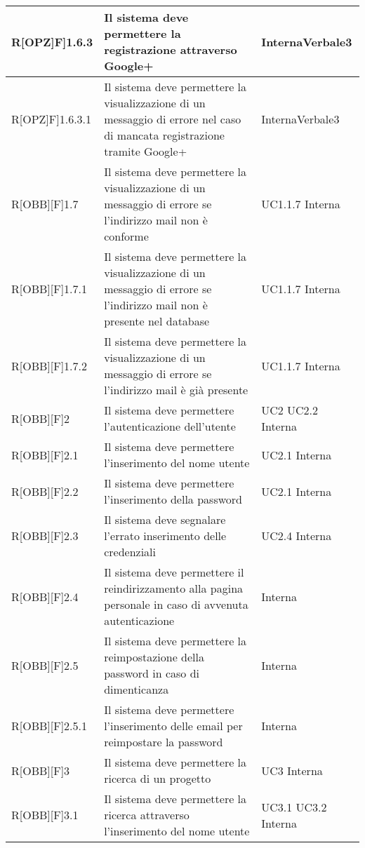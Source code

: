 	\begin{table}[H]
			\begin{tabular}{|p{}|p{}|p{}|}
			\midrule
			R[OPZ]F]1.6.3 & Il sistema deve permettere la registrazione attraverso Google+ & Interna\newline Verbale3\\ \midrule 
			R[OPZ]F]1.6.3.1 & Il sistema deve permettere la visualizzazione di un
			messaggio di errore nel caso di mancata registrazione
			tramite Google+ & Interna\newline Verbale3\\ \midrule 
			R[OBB][F]1.7 & Il sistema deve permettere la visualizzazione di un messaggio di errore se l'indirizzo mail non è conforme & UC1.1.7 Interna\\ \midrule 
			R[OBB][F]1.7.1 & Il sistema deve permettere la visualizzazione di un
			messaggio di errore se l'indirizzo mail non è presente nel database & UC1.1.7 Interna\\ \midrule 
			R[OBB][F]1.7.2 & Il sistema deve permettere la visualizzazione di un
			messaggio di errore se l'indirizzo mail è già presente & UC1.1.7 Interna\\ \midrule 
			R[OBB][F]2 & Il sistema deve permettere l'autenticazione dell'utente & UC2 UC2.2 Interna\\ \midrule 
			R[OBB][F]2.1 & Il sistema deve permettere l'inserimento del nome
			utente & UC2.1 Interna\\ \midrule 
			R[OBB][F]2.2 & Il sistema deve permettere l'inserimento della
			password & UC2.1 Interna\\ \midrule 
			R[OBB][F]2.3 & Il sistema deve segnalare l'errato inserimento delle credenziali & UC2.4 Interna\\ \midrule 
			R[OBB][F]2.4 & Il sistema deve permettere il reindirizzamento alla pagina personale in caso di avvenuta autenticazione & Interna\\ \midrule 
			R[OBB][F]2.5 & Il sistema deve permettere la reimpostazione della password in caso di dimenticanza & Interna\\ \midrule 
			R[OBB][F]2.5.1 & Il sistema deve permettere l'inserimento delle email
			per reimpostare la password & Interna\\ \midrule 
			R[OBB][F]3 & Il sistema deve permettere la ricerca di un progetto & UC3 Interna\\ \midrule 
			R[OBB][F]3.1 & Il sistema deve permettere la ricerca attraverso
			l'inserimento del nome utente & UC3.1 UC3.2 Interna\\ \midrule 

\end{tabular}
\end{table}
